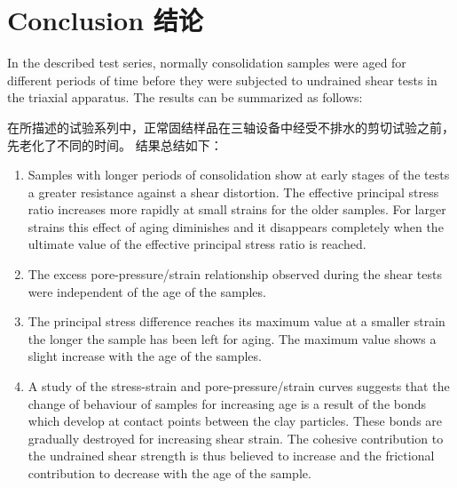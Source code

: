 \section{Conclusion 结论}

\begin{paracol}{2}
    
    In the described test series, normally consolidation samples were aged for different periods of time before they were subjected to undrained shear tests in the triaxial apparatus. The results can be summarized as follows:

    \switchcolumn

    在所描述的试验系列中，正常固结样品在三轴设备中经受不排水的剪切试验之前，先老化了不同的时间。 结果总结如下：

    \switchcolumn*

    \begin{enumerate}
        \item Samples with longer periods of consolidation show at early stages of the tests a greater resistance against a shear distortion. The effective principal stress ratio increases more rapidly at small strains for the older samples. For larger strains this effect of aging diminishes and it disappears completely when the ultimate value of the effective principal stress ratio is reached.
        \item The excess pore-pressure/strain relationship observed during the shear tests were independent of the age of the samples.
        \item The principal stress difference reaches its maximum value at a smaller strain the longer the sample has been left for aging. The maximum value shows a slight increase with the age of the samples.
        \item A study of the stress-strain and pore-pressure/strain curves suggests that the change of behaviour of samples for increasing age is a result of the bonds which develop at contact points between the clay particles. These bonds are gradually destroyed for increasing shear strain. The cohesive contribution to the undrained shear strength is thus believed to increase and the frictional contribution to decrease with the age of the sample.
    \end{enumerate}

    \switchcolumn
    

\end{paracol}
